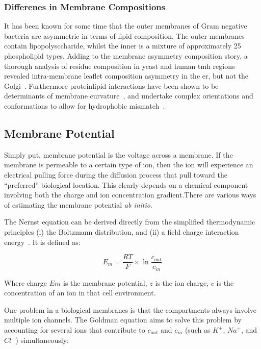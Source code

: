 \subsubsection{Differenes in Membrane Compositions}

It has been known for some time that the outer membranes of Gram negative bacteria are asymmetric in terms of lipid composition. The outer membranes contain lipopolysccharide, whilst the inner is a mixture of approximately 25 phospholipid types. Adding to the membrane asymmetry composition story, a thorough analysis of residue composition in yeast and human \gls{tmh} regions revealed intra-membrane leaflet composition asymmetry in the \gls{er}, but not the Golgi~\cite{Sharpe2010}. Furthermore protein\-lipid interactions have been shown to be determinants of membrane curvature~\cite{Jensen2004}, and undertake complex orientations and conformations to allow for hydrophobic mismatch~\cite{Planque2003}. %

\subsection{Membrane Potential}
Simply put, membrane potential is the voltage across a membrane. If the membrane is permeable to a certain type of ion, then the ion will experience an electrical pulling force during the diffusion process that pull toward the ``preferred'' biological location. This clearly depends on a chemical component involving both the charge and ion concentration gradient.There are various ways of estimating the membrane potential \textit{ ab initio}.

The Nernst equation can be derived directly from the simplified thermodynamic principles (i) the Boltzmann distribution, and (ii) a field charge interaction energy~\cite{Feiner1994}. It is defined as:

\begin{equation}
{E}_{m}=\frac{RT}{F}\times \ln { \frac{{c}_{out}}{{c}_{in}} }
\end{equation}

Where charge $Em$ is the membrane potential, $z$ is the ion charge, $c$ is the concentration of an ion in that cell environment.

One problem in a biological membranes is that the compartments always  involve multiple ion channels. The Goldman equation aims to solve this problem by accounting for several ions that contribute to $c_{out}$ and $c_{in}$ (such as $K^+$, $Na^+$, and $Cl^-$) simultaneously:

